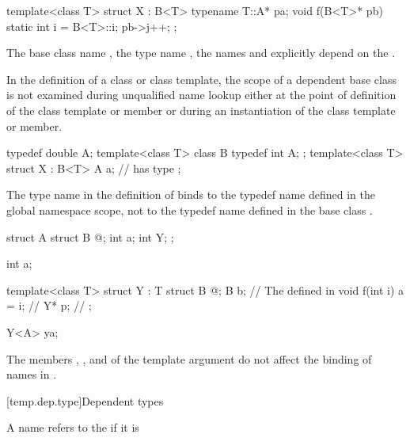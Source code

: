 \pnum
\begin{example}
\begin{codeblock}
template<class T> struct X : B<T> {
  typename T::A* pa;
  void f(B<T>* pb) {
    static int i = B<T>::i;
    pb->j++;
  }
};
\end{codeblock}

The base class name
,
the type name
,
the names
and
explicitly depend on the
.
\end{example}

\pnum
In the definition of a class or class template,
the scope of a dependent base class
is not examined during unqualified
name lookup either at the point of definition of the
class template or member or during an instantiation of
the class template or member.
\begin{example}

\begin{codeblock}
typedef double A;
template<class T> class B {
  typedef int A;
};
template<class T> struct X : B<T> {
  A a;              //  has type 
};
\end{codeblock}

The type name
in the definition of
binds to the typedef name defined in the global
namespace scope, not to the typedef name
defined in the base class
.
\end{example}
\begin{example}

\begin{codeblock}
struct A {
  struct B { @\commentellip@ };
  int a;
  int Y;
};

int a;

template<class T> struct Y : T {
  struct B { @\commentellip@ };
  B b;                          // The  defined in 
  void f(int i) { a = i; }      // 
  Y* p;                         // 
};

Y<A> ya;
\end{codeblock}

The members
,
,
and
of the template argument
do not affect the binding of names in
.
\end{example}

[temp.dep.type]{Dependent types}

\pnum
A name refers to the
if it is

